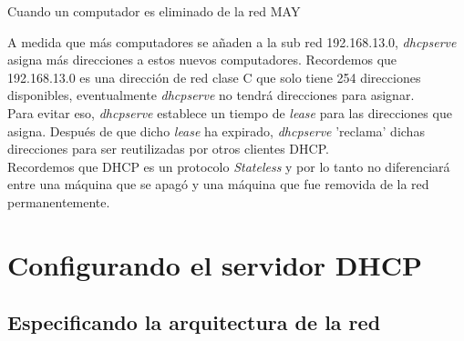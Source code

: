 \begin{frame}[fragile]{Cuando un computador es eliminado de la red MAY}

   A medida que más computadores se añaden a la sub red 192.168.13.0,
   \textit{dhcpserve} asigna más direcciones a estos nuevos computadores.
   Recordemos que 192.168.13.0 es una dirección de red clase C que solo tiene
   254 direcciones disponibles, eventualmente \textit{dhcpserve} no tendrá
   direcciones para asignar.\\[0.2cm]

   Para evitar eso, \textit{dhcpserve} establece un tiempo de \textit{lease}
   para las direcciones que asigna. Después de que dicho \textit{lease} ha
   expirado, \textit{dhcpserve} 'reclama' dichas direcciones para ser
   reutilizadas por otros clientes DHCP.\\[0.2cm]

   Recordemos que DHCP es un protocolo \textit{Stateless} y por lo tanto no
   diferenciará entre una máquina que se apagó y una máquina que fue removida
   de la red permanentemente.\\[0.2cm]

\end{frame}

\section{Configurando el servidor DHCP} %
\label{sec:Configurando el servidor DHCP}


\subsection{Especificando la arquitectura de la red} %
\label{sub:Especificando la arquitectura de la red}


